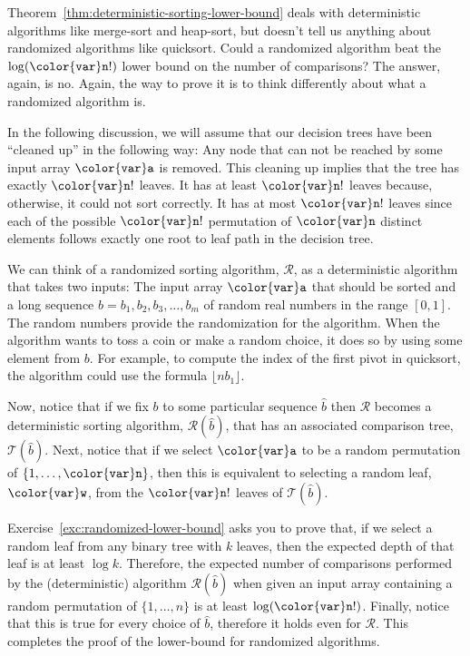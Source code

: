 \documentclass[10pt]{book}
\theoremstyle{plain}
\newcommand{\thmref}[1]{Theorem~\ref{thm:#1}}
\theoremstyle{definition}
\newcommand{\excref}[1]{Exercise~\ref{exc:#1}}
\begin{document}
\thmref{deterministic-sorting-lower-bound} deals with deterministic
algorithms like merge-sort and heap-sort, but doesn't tell us anything
about randomized algorithms like quicksort.  Could a randomized algorithm
beat the $\log(\ensuremath{\mathtt{{\color{var}n}}}!)$ lower bound on the number of comparisons?
The answer, again, is no.  Again, the way to prove it is to think
differently about what a randomized algorithm is.

In the following discussion, we will assume that our decision
trees have been ``cleaned up'' in the following way: Any node that can not
be reached by some input array \ensuremath{\mathtt{{\color{var}a}}} is removed.  This cleaning up implies
that the tree has exactly $\ensuremath{\mathtt{{\color{var}n}}}!$ leaves.  It has at least $\ensuremath{\mathtt{{\color{var}n}}}!$ leaves
because, otherwise, it could not sort correctly.  It has at most $\ensuremath{\mathtt{{\color{var}n}}}!$
leaves since each of the possible $\ensuremath{\mathtt{{\color{var}n}}}!$ permutation of \ensuremath{\mathtt{{\color{var}n}}} distinct
elements follows exactly one root to leaf path in the decision tree.

We can think of a randomized sorting algorithm, $\mathcal{R}$, as a
deterministic algorithm that takes two inputs: The input array \ensuremath{\mathtt{{\color{var}a}}}
that should be sorted and a long sequence $b=b_1,b_2,b_3,\ldots,b_m$
of random real numbers in the range $[0,1]$.  The random numbers provide
the randomization for the algorithm.  When the algorithm wants to toss a
coin or make a random choice, it does so by using some element from $b$.
For example, to compute the index of the first pivot in quicksort,
the algorithm could use the formula $\lfloor n b_1\rfloor$.

Now, notice that if we fix $b$ to some particular sequence $\hat{b}$
then $\mathcal{R}$ becomes a deterministic sorting algorithm,
$\mathcal{R}(\hat{b})$, that has an associated comparison tree,
$\mathcal{T}(\hat{b})$.  Next, notice that if we select \ensuremath{\mathtt{{\color{var}a}}} to be a random
permutation of $\{1,\ldots,\ensuremath{\mathtt{{\color{var}n}}}\}$, then this is equivalent to selecting
a random leaf, \ensuremath{\mathtt{{\color{var}w}}}, from the $\ensuremath{\mathtt{{\color{var}n}}}!$ leaves of $\mathcal{T}(\hat{b})$.

\excref{randomized-lower-bound} asks you to prove that, if we select
a random leaf from any binary tree with $k$ leaves, then the expected
depth of that leaf is at least $\log k$.  Therefore, the expected
number of comparisons performed by the (deterministic) algorithm
$\mathcal{R}(\hat{b})$ when given an input array containing a random
permutation of $\{1,\ldots,n\}$ is at least $\log(\ensuremath{\mathtt{{\color{var}n}}}!)$.  Finally,
notice that this is true for every choice of $\hat{b}$, therefore it holds even for $\mathcal{R}$.  This completes the proof of the lower-bound for randomized algorithms.
\end{document}
